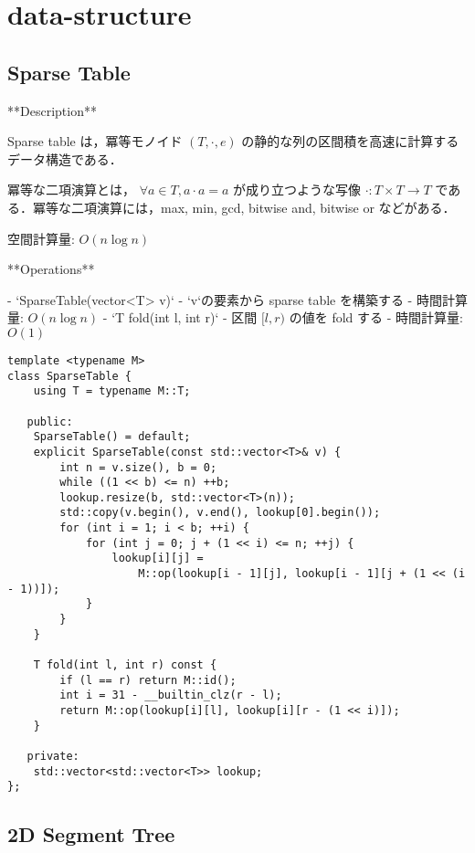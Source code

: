 \section{data-structure}

\subsection{Sparse Table}

\begin{small}
\begin{markdown}
**Description**

Sparse table は，冪等モノイド $(T, \cdot, e)$ の静的な列の区間積を高速に計算するデータ構造である．

冪等な二項演算とは， $\forall a \in T, a \cdot a = a$ が成り立つような写像 $\cdot: T \times T \rightarrow T$ である．冪等な二項演算には，max, min, gcd, bitwise and, bitwise or などがある．

空間計算量: $O(n \log n)$

**Operations**

- `SparseTable(vector<T> v)`
    - `v`の要素から sparse table を構築する
    - 時間計算量: $O(n \log n)$
- `T fold(int l, int r)`
    - 区間 $[l, r)$ の値を fold する
    - 時間計算量: $O(1)$

\end{markdown}
\end{small}

\begin{lstlisting}
template <typename M>
class SparseTable {
    using T = typename M::T;

   public:
    SparseTable() = default;
    explicit SparseTable(const std::vector<T>& v) {
        int n = v.size(), b = 0;
        while ((1 << b) <= n) ++b;
        lookup.resize(b, std::vector<T>(n));
        std::copy(v.begin(), v.end(), lookup[0].begin());
        for (int i = 1; i < b; ++i) {
            for (int j = 0; j + (1 << i) <= n; ++j) {
                lookup[i][j] =
                    M::op(lookup[i - 1][j], lookup[i - 1][j + (1 << (i - 1))]);
            }
        }
    }

    T fold(int l, int r) const {
        if (l == r) return M::id();
        int i = 31 - __builtin_clz(r - l);
        return M::op(lookup[i][l], lookup[i][r - (1 << i)]);
    }

   private:
    std::vector<std::vector<T>> lookup;
};
\end{lstlisting}

\subsection{2D Segment Tree}

